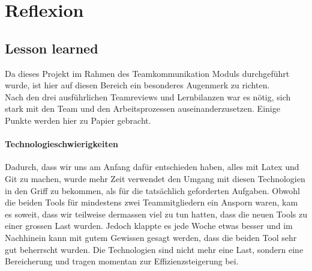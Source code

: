 \chapter{Reflexion}

\section{Lesson learned}

Da dieses Projekt im Rahmen des Teamkommunikation Moduls durchgeführt wurde, ist hier auf diesen Bereich ein besonderes Augenmerk zu richten. \\
Nach den drei ausführlichen Teamreviews und Lernbilanzen war es nötig, sich stark mit den Team und den Arbeitsprozessen auseinanderzusetzen. Einige Punkte werden hier zu Papier gebracht.

\subsubsection{Technologieschwierigkeiten} \label{sec:techn}

Dadurch, dass wir uns am Anfang dafür entschieden haben, alles mit Latex und Git zu machen, wurde mehr Zeit verwendet den Umgang mit diesen Technologien in den Griff zu bekommen, als für die tatsächlich geforderten Aufgaben. Obwohl die beiden Tools für mindestens zwei Teammitgliedern ein Ansporn waren, kam es soweit, dass wir teilweise dermassen viel zu tun hatten, dass die neuen Tools zu einer grossen Last wurden. Jedoch klappte es jede Woche etwas besser und im Nachhinein kann mit gutem Gewissen gesagt werden, dass die beiden Tool sehr gut beherrscht wurden. Die Technologien sind nicht mehr eine Last, sondern eine Bereicherung und tragen momentan zur Effizienzsteigerung bei.


